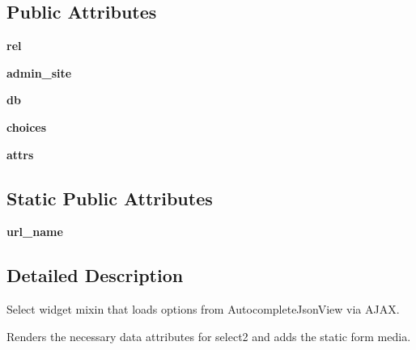 \subsection*{Public Attributes}
\begin{DoxyCompactItemize}
\item 
\mbox{\label{classdjango_1_1contrib_1_1admin_1_1widgets_1_1_autocomplete_mixin_a22be30ffd13ffebfb12c1c0d171a1412}} 
{\bfseries rel}
\item 
\mbox{\label{classdjango_1_1contrib_1_1admin_1_1widgets_1_1_autocomplete_mixin_ae6f52b3a63e48f09fb809ce723fba3d4}} 
{\bfseries admin\+\_\+site}
\item 
\mbox{\label{classdjango_1_1contrib_1_1admin_1_1widgets_1_1_autocomplete_mixin_a105d8d227ce72fef5e77bc73327c4b1f}} 
{\bfseries db}
\item 
\mbox{\label{classdjango_1_1contrib_1_1admin_1_1widgets_1_1_autocomplete_mixin_a9cd492a6cdfe0a20d2e9970fee9f0e27}} 
{\bfseries choices}
\item 
\mbox{\label{classdjango_1_1contrib_1_1admin_1_1widgets_1_1_autocomplete_mixin_af74e6106d970034a2de9e0df3455e452}} 
{\bfseries attrs}
\end{DoxyCompactItemize}
\subsection*{Static Public Attributes}
\begin{DoxyCompactItemize}
\item 
\mbox{\label{classdjango_1_1contrib_1_1admin_1_1widgets_1_1_autocomplete_mixin_a770f1714688f1d2d287dec00559f231a}} 
{\bfseries url\+\_\+name}
\end{DoxyCompactItemize}


\subsection{Detailed Description}
\begin{DoxyVerb}Select widget mixin that loads options from AutocompleteJsonView via AJAX.

Renders the necessary data attributes for select2 and adds the static form
media.
\end{DoxyVerb}
 

